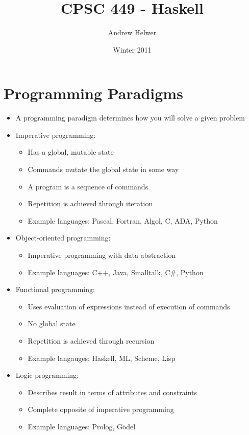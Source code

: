 \documentclass{article}
\begin{document}
\lstset{language=Haskell, frame = single}

\title{CPSC 449 - Haskell}
\author{Andrew Helwer}
\date{Winter 2011}
\maketitle

\section{Programming Paradigms}

\begin{itemize}
\item A programming paradigm determines how you will solve a given problem
\item Imperative programming:
\begin{itemize}
\item Has a global, mutable state
\item Commands mutate the global state in some way
\item A program is a sequence of commands
\item Repetition is achieved through iteration
\item Example languages: Pascal, Fortran, Algol, C, ADA, Python
\end{itemize}
\item Object-oriented programming:
\begin{itemize}
\item Imperative programming with data abstraction
\item Example languages: C++, Java, Smalltalk, C$\#$, Python
\end{itemize}
\item Functional programming:
\begin{itemize}
\item Uses evaluation of expressions instead of execution of commands
\item No global state
\item Repetition is achieved through recursion
\item Example langauges: Haskell, ML, Scheme, Lisp
\end{itemize}
\item Logic programming:
\begin{itemize}
\item Describes result in terms of attributes and constraints
\item Complete opposite of imperative programming
\item Example languages: Prolog, G\"{o}del
\end{itemize}
\end{itemize}
\end{document}
